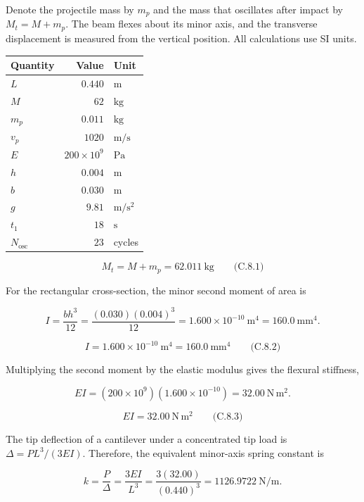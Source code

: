 Denote the projectile mass by \(m_p\) and the mass that oscillates after impact by \(M_t=M+m_p\). The beam flexes about its minor axis, and the transverse displacement is measured from the vertical position. All calculations use SI units.

\begin{center}
\small
\begin{tabular}{@{}lrl@{}}
\toprule
Quantity & Value & Unit \\
\midrule
\(L\) & \(0.440\) & \(\mathrm{m}\) \\
\(M\) & \(62\) & \(\mathrm{kg}\) \\
\(m_p\) & \(0.011\) & \(\mathrm{kg}\) \\
\(v_p\) & \(1020\) & \(\mathrm{m/s}\) \\
\(E\) & \(200\times10^9\) & \(\mathrm{Pa}\) \\
\(h\) & \(0.004\) & \(\mathrm{m}\) \\
\(b\) & \(0.030\) & \(\mathrm{m}\) \\
\(g\) & \(9.81\) & \(\mathrm{m/s^2}\) \\
\(t_1\) & \(18\) & \(\mathrm{s}\) \\
\(N_{\mathrm{osc}}\) & \(23\) & cycles \\
\bottomrule
\end{tabular}
\end{center}

\[
\boxed{M_t=M+m_p=62.011\ \mathrm{kg}}
\qquad\text{(C.8.1)}
\]

For the rectangular cross-section, the minor second moment of area is

\[
I=\frac{bh^3}{12}
=\frac{(0.030)(0.004)^3}{12}
=1.600\times10^{-10}\ \mathrm{m^4}
=160.0\ \mathrm{mm^4}.
\]

\[
\boxed{I=1.600\times10^{-10}\ \mathrm{m^4}
=160.0\ \mathrm{mm^4}}
\qquad\text{(C.8.2)}
\]

Multiplying the second moment by the elastic modulus gives the flexural stiffness,

\[
EI=(200\times10^9)(1.600\times10^{-10})
=32.00\ \mathrm{N\,m^2}.
\]

\[
\boxed{EI=32.00\ \mathrm{N\,m^2}}
\qquad\text{(C.8.3)}
\]

The tip deflection of a cantilever under a concentrated tip load is \(\Delta=PL^3/(3EI)\). Therefore, the equivalent minor-axis spring constant is

\[
k=\frac{P}{\Delta}
=\frac{3EI}{L^3}
=\frac{3(32.00)}{(0.440)^3}
=1126.9722\ \mathrm{N/m}.
\]

